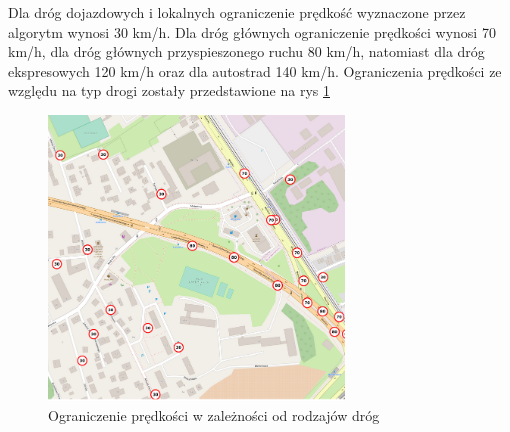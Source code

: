 Dla dróg dojazdowych i lokalnych ograniczenie prędkość wyznaczone przez algorytm wynosi 30 km/h. Dla dróg głównych ograniczenie prędkości wynosi 70 km/h, dla dróg głównych przyspieszonego ruchu 80 km/h, natomiast dla dróg ekspresowych 120 km/h oraz dla autostrad 140 km/h. Ograniczenia prędkości ze względu na typ drogi zostały przedstawione na rys \ref{sec:typeOfRoad}
\begin{figure}[h]
\caption{Ograniczenie prędkości w zależności od rodzajów dróg}
\label{sec:typeOfRoad}
\centering
\includegraphics[width=0.7\textwidth]{typeOfRoad}
\end{figure}

\newpage
